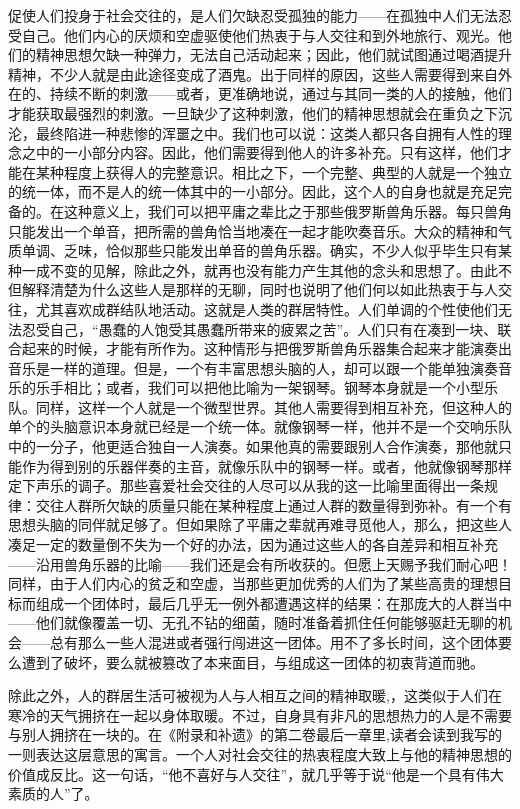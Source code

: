 \documentclass[11pt,oneside]{article}
\begin{document}
\begin{common-format}
促使人们投身于社会交往的，是人们欠缺忍受孤独的能力——在孤独中人们无法忍受自己。他们内心的厌烦和空虚驱使他们热衷于与人交往和到外地旅行、观光。他们的精神思想欠缺一种弹力，无法自己活动起来；因此，他们就试图通过喝酒提升精神，不少人就是由此途径变成了酒鬼。出于同样的原因，这些人需要得到来自外在的、持续不断的刺激——或者，更准确地说，通过与其同一类的人的接触，他们才能获取最强烈的刺激。一旦缺少了这种刺激，他们的精神思想就会在重负之下沉沦，最终陷进一种悲惨的浑噩之中。我们也可以说：这类人都只各自拥有人性的理念之中的一小部分内容。因此，他们需要得到他人的许多补充。只有这样，他们才能在某种程度上获得人的完整意识。相比之下，一个完整、典型的人就是一个独立的统一体，而不是人的统一体其中的一小部分。因此，这个人的自身也就是充足完备的。在这种意义上，我们可以把平庸之辈比之于那些俄罗斯兽角乐器。每只兽角只能发出一个单音，把所需的兽角恰当地凑在一起才能吹奏音乐。大众的精神和气质单调、乏味，恰似那些只能发出单音的兽角乐器。确实，不少人似乎毕生只有某种一成不变的见解，除此之外，就再也没有能力产生其他的念头和思想了。由此不但解释清楚为什么这些人是那样的无聊，同时也说明了他们何以如此热衷于与人交往，尤其喜欢成群结队地活动。这就是人类的群居特性。人们单调的个性使他们无法忍受自己，“愚蠢的人饱受其愚蠢所带来的疲累之苦”。人们只有在凑到一块、联合起来的时候，才能有所作为。这种情形与把俄罗斯兽角乐器集合起来才能演奏出音乐是一样的道理。但是，一个有丰富思想头脑的人，却可以跟一个能单独演奏音乐的乐手相比；或者，我们可以把他比喻为一架钢琴。钢琴本身就是一个小型乐队。同样，这样一个人就是一个微型世界。其他人需要得到相互补充，但这种人的单个的头脑意识本身就已经是一个统一体。就像钢琴一样，他并不是一个交响乐队中的一分子，他更适合独自一人演奏。如果他真的需要跟别人合作演奏，那他就只能作为得到别的乐器伴奏的主音，就像乐队中的钢琴一样。或者，他就像钢琴那样定下声乐的调子。那些喜爱社会交往的人尽可以从我的这一比喻里面得出一条规律：交往人群所欠缺的质量只能在某种程度上通过人群的数量得到弥补。有一个有思想头脑的同伴就足够了。但如果除了平庸之辈就再难寻觅他人，那么，把这些人凑足一定的数量倒不失为一个好的办法，因为通过这些人的各自差异和相互补充——沿用兽角乐器的比喻——我们还是会有所收获的。但愿上天赐予我们耐心吧！同样，由于人们内心的贫乏和空虚，当那些更加优秀的人们为了某些高贵的理想目标而组成一个团体时，最后几乎无一例外都遭遇这样的结果：在那庞大的人群当中——他们就像覆盖一切、无孔不钻的细菌，随时准备着抓住任何能够驱赶无聊的机会——总有那么一些人混进或者强行闯进这一团体。用不了多长时间，这个团体要么遭到了破坏，要么就被篡改了本来面目，与组成这一团体的初衷背道而驰。 

除此之外，人的群居生活可被视为人与人相互之间的精神取暖,，这类似于人们在寒冷的天气拥挤在一起以身体取暖。不过，自身具有非凡的思想热力的人是不需要与别人拥挤在一块的。在《附录和补遗》的第二卷最后一章里,读者会读到我写的一则表达这层意思的寓言。一个人对社会交往的热衷程度大致上与他的精神思想的价值成反比。这一句话，“他不喜好与人交往”，就几乎等于说“他是一个具有伟大素质的人”了。 


\end{common-format}
\end{document}
